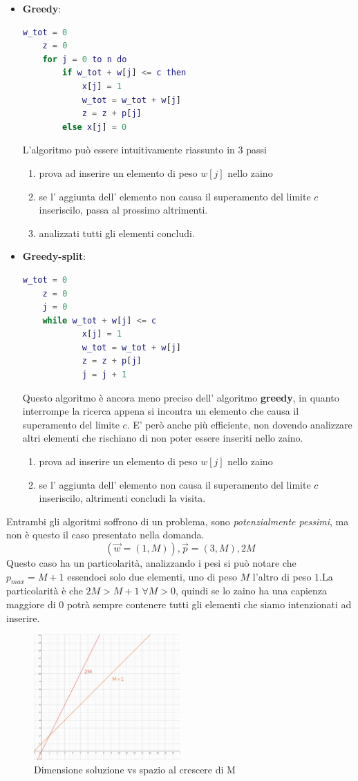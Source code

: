 \documentclass[a4paper]{article}
\begin{document}
\begin{itemize}
	\item \textbf{Greedy}: 
		\begin{lstlisting}[language=Matlab]
	w_tot = 0
	z = 0
	for j = 0 to n do
		if w_tot + w[j] <= c then
			x[j] = 1
			w_tot = w_tot + w[j]
			z = z + p[j]
		else x[j] = 0
		\end{lstlisting}
		L'algoritmo può essere intuitivamente riassunto in 3 passi
		\begin{enumerate}
			\item prova ad inserire un elemento di peso $w[j]$ nello zaino
			\item se l' aggiunta dell' elemento non causa il superamento del limite $c$ inseriscilo, passa al prossimo altrimenti.
			\item analizzati tutti gli elementi concludi.
		\end{enumerate}
	\item \textbf{Greedy-split}:
		\begin{lstlisting}[language=Matlab]
	w_tot = 0
	z = 0
	j = 0
	while w_tot + w[j] <= c
			x[j] = 1
			w_tot = w_tot + w[j]
			z = z + p[j]
			j = j + 1
		\end{lstlisting}
		Questo algoritmo è ancora meno preciso dell' algoritmo \textbf{greedy}, in quanto interrompe la ricerca appena si incontra un elemento che causa il superamento del limite $c$.
		E' però anche più efficiente, non dovendo analizzare altri elementi che rischiano di non poter essere inseriti nello zaino.
		\begin{enumerate}
			\item prova ad inserire un elemento di peso $w[j]$ nello zaino
			\item se l' aggiunta dell' elemento non causa il superamento del limite $c$ inseriscilo, altrimenti concludi la visita.
		\end{enumerate}
\end{itemize}
Entrambi gli algoritmi soffrono di un problema, sono \textit{potenzialmente pessimi}, ma non è questo il caso presentato nella domanda.
$$(\vec w = (1,M)), \vec p = (3,M), 2M$$
Questo caso ha un particolarità, analizzando i pesi si può notare che $p_{max} = M +1$ essendoci solo due elementi, uno di peso $M$ l'altro di peso $1$.La particolarità è che $2M > M + 1 \; \forall M > 0$, quindi se lo zaino ha una capienza maggiore di $0$ potrà sempre contenere tutti gli elementi che siamo intenzionati ad inserire.
\begin{figure}[!ht]
\centering
\includegraphics[width=0.5\textwidth]{./img/C_8.png}
\caption{Dimensione soluzione vs spazio al crescere di M} \label{FIG:C_8}
\end{figure}\\
\end{document}
